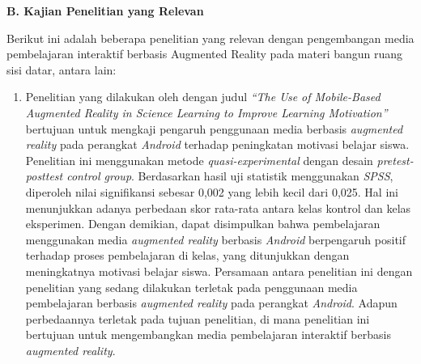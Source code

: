 \textbf{B. Kajian Penelitian yang Relevan}\\
\hspace*{1cm}Berikut ini adalah beberapa penelitian yang relevan dengan pengembangan media pembelajaran interaktif berbasis Augmented Reality pada materi bangun ruang sisi datar, antara lain:
\begin{enumerate}
    \item Penelitian yang dilakukan oleh \citet{maulana2020} dengan judul \textit{“The Use of Mobile-Based Augmented Reality in Science Learning to Improve Learning Motivation”} bertujuan untuk mengkaji pengaruh penggunaan media berbasis \textit{augmented reality} pada perangkat \textit{Android} terhadap peningkatan motivasi belajar siswa. Penelitian ini menggunakan metode \textit{quasi-experimental} dengan desain \textit{pretest-posttest control group}. Berdasarkan hasil uji statistik menggunakan \textit{SPSS}, diperoleh nilai signifikansi sebesar 0{,}002 yang lebih kecil dari 0{,}025. Hal ini menunjukkan adanya perbedaan skor rata-rata antara kelas kontrol dan kelas eksperimen. Dengan demikian, dapat disimpulkan bahwa pembelajaran menggunakan media \textit{augmented reality} berbasis \textit{Android} berpengaruh positif terhadap proses pembelajaran di kelas, yang ditunjukkan dengan meningkatnya motivasi belajar siswa.
    Persamaan antara penelitian ini dengan penelitian yang sedang dilakukan terletak pada penggunaan media pembelajaran berbasis \textit{augmented reality} pada perangkat \textit{Android}. Adapun perbedaannya terletak pada tujuan penelitian, di mana penelitian ini bertujuan untuk mengembangkan media pembelajaran interaktif berbasis \textit{augmented reality}.

\end{enumerate}
